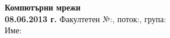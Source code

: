 \documentclass[9pt,answers,addpoints,twoside]{exam}
\begin{document}
\pagestyle{headandfoot}
\firstpageheader
  {\large\bfseries Компютърни мрежи\\08.06.2013 г.}
  {}
  {Факултетен №:\enspace\makebox[2cm]{\dotfill},
    поток:\enspace\makebox[1cm]{\dotfill},
    група:\enspace\makebox[1cm]{\dotfill}\\
    Име:\enspace\makebox[8.4cm]{\dotfill}}




\cleardoublepage


\end{document}
